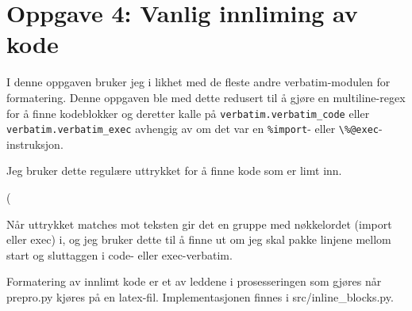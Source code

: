 \section*{Oppgave 4: Vanlig innliming av kode}

I denne oppgaven bruker jeg i likhet med de fleste andre verbatim-modulen for formatering. Denne oppgaven ble med dette redusert til å gjøre en multiline-regex for å finne kodeblokker og deretter kalle på \verb;verbatim.verbatim_code; eller \verb;verbatim.verbatim_exec; avhengig av om det var en \verb;%import;- eller \verb;\%@exec;-instruksjon.

Jeg bruker dette regulære uttrykket for å finne kode som er limt inn.

(%

Når uttrykket matches mot teksten gir det en gruppe med nøkkelordet (import eller exec) i, og jeg bruker dette til å finne ut om jeg skal pakke linjene mellom start og sluttaggen i code- eller exec-verbatim.

Formatering av innlimt kode er et av leddene i prosesseringen som gjøres når prepro.py kjøres på en latex-fil. Implementasjonen finnes i src/inline\_blocks.py.